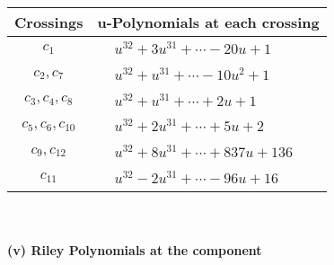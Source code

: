 \documentclass[1p]{elsarticle_modified}
\theoremstyle{definition}
\begin{document}
\begin{tabular}{m{50pt}|m{274pt}}
Crossings & \hspace{64pt}u-Polynomials at each crossing \\
\hline $$\begin{aligned}c_{1}\end{aligned}$$&$\begin{aligned}
&u^{32}+3 u^{31}+\cdots-20 u+1
\end{aligned}$\\
\hline $$\begin{aligned}c_{2},c_{7}\end{aligned}$$&$\begin{aligned}
&u^{32}+u^{31}+\cdots-10 u^2+1
\end{aligned}$\\
\hline $$\begin{aligned}c_{3},c_{4},c_{8}\end{aligned}$$&$\begin{aligned}
&u^{32}+u^{31}+\cdots+2 u+1
\end{aligned}$\\
\hline $$\begin{aligned}c_{5},c_{6},c_{10}\end{aligned}$$&$\begin{aligned}
&u^{32}+2 u^{31}+\cdots+5 u+2
\end{aligned}$\\
\hline $$\begin{aligned}c_{9},c_{12}\end{aligned}$$&$\begin{aligned}
&u^{32}+8 u^{31}+\cdots+837 u+136
\end{aligned}$\\
\hline $$\begin{aligned}c_{11}\end{aligned}$$&$\begin{aligned}
&u^{32}-2 u^{31}+\cdots-96 u+16
\end{aligned}$\\
\hline
\end{tabular}\\~\\
\newpage\renewcommand{\arraystretch}{1}
\flushleft \textbf{(v) Riley Polynomials at the component}\newline \\
\end{document}
